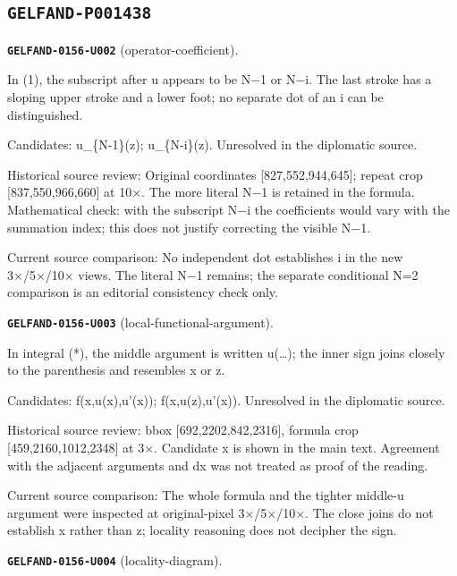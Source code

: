 \subsection*{\texttt{GELFAND-P001438}}
\par\noindent\leavevmode{}\label{GELFAND-0156-U002}\label{GELFAND-P001438:operator-coefficient}\textbf{\texttt{GELFAND-0156-U002}} (operator-coefficient).\nopagebreak[4]\par
In (1), the subscript after u appears to be N−1 or N−i. The last stroke has a sloping upper stroke and a lower foot; no separate dot of an i can be distinguished.\par
Candidates: u\_\{N-1\}(z); u\_\{N-i\}(z). Unresolved in the diplomatic source.\par
Historical source review: Original coordinates [827,552,944,645]; repeat crop [837,550,966,660] at 10×. The more literal N−1 is retained in the formula. Mathematical check: with the subscript N−i the coefficients would vary with the summation index; this does not justify correcting the visible N−1.\par
Current source comparison: No independent dot establishes i in the new 3×/5×/10× views. The literal N−1 remains; the separate conditional N=2 comparison is an editorial consistency check only.\par\medskip
\par\noindent\leavevmode{}\label{GELFAND-0156-U003}\label{GELFAND-P001438:local-functional-argument}\textbf{\texttt{GELFAND-0156-U003}} (local-functional-argument).\nopagebreak[4]\par
In integral (*), the middle argument is written u(…); the inner sign joins closely to the parenthesis and resembles x or z.\par
Candidates: f(x,u(x),u'(x)); f(x,u(z),u'(x)). Unresolved in the diplomatic source.\par
Historical source review: bbox [692,2202,842,2316], formula crop [459,2160,1012,2348] at 3×. Candidate x is shown in the main text. Agreement with the adjacent arguments and dx was not treated as proof of the reading.\par
Current source comparison: The whole formula and the tighter middle-u argument were inspected at original-pixel 3×/5×/10×. The close joins do not establish x rather than z; locality reasoning does not decipher the sign.\par\medskip
\par\noindent\leavevmode{}\label{GELFAND-0156-U004}\label{GELFAND-P001438:locality-diagram}\textbf{\texttt{GELFAND-0156-U004}} (locality-diagram).\nopagebreak[4]\par
